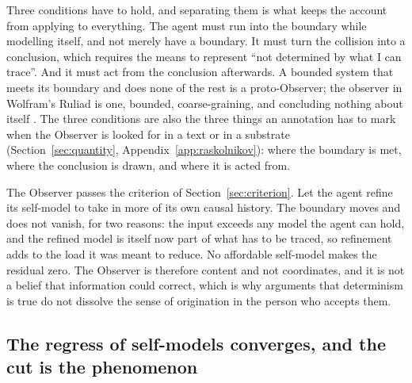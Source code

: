 Three conditions have to hold, and separating them is what keeps the account from applying to
everything. The agent must run into the boundary while modelling itself, and not merely have a
boundary. It must turn the collision into a conclusion, which requires the means to represent ``not
determined by what I can trace''. And it must act from the conclusion afterwards. A bounded system that
meets its boundary and does none of the rest is a proto-Observer; the observer in Wolfram's Ruliad is
one, bounded, coarse-graining, and concluding nothing about itself \citep{wolfram2020,wolfram2023}.
The three conditions are also the three things an annotation has to mark when the Observer is looked
for in a text or in a substrate (Section~\ref{sec:quantity}, Appendix~\ref{app:raskolnikov}): where
the boundary is met, where the conclusion is drawn, and where it is acted from.

The Observer passes the criterion of Section~\ref{sec:criterion}. Let the agent refine its self-model
to take in more of its own causal history. The boundary moves and does not vanish, for two reasons: the
input exceeds any model the agent can hold, and the refined model is itself now part of what has to be
traced, so refinement adds to the load it was meant to reduce. No affordable self-model makes the
residual zero. The Observer is therefore content and not coordinates, and it is not a belief that
information could correct, which is why arguments that determinism is true do not dissolve the sense of
origination in the person who accepts them.

\subsection{The regress of self-models converges, and the cut is the phenomenon}
\label{sec:regress}

